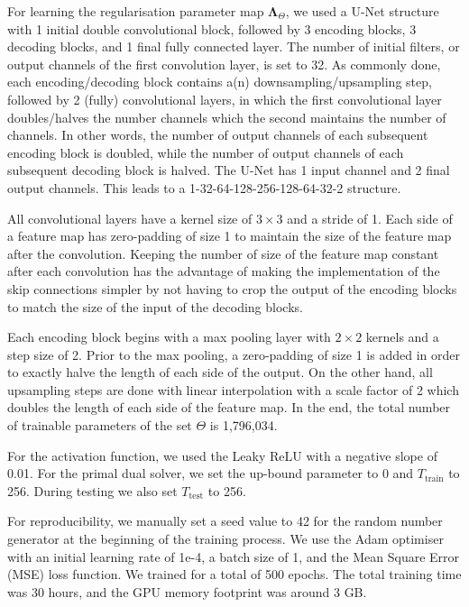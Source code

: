 \documentclass[12pt]{article}
\begin{document}

For learning the regularisation parameter map $\mathbf{\Lambda}_{\Theta}$, we used a U-Net structure with 1 initial double convolutional block, followed by 3 encoding blocks, 3 decoding blocks, and 1 final fully connected layer.
The number of initial filters, or output channels of the first convolution layer, is set to 32.
As commonly done, each encoding/decoding block contains a(n) downsampling/upsampling step, followed by 2 (fully) convolutional layers, in which the first convolutional layer doubles/halves the number channels which the second maintains the number of channels.
In other words, the number of output channels of each subsequent encoding block is doubled, while the number of output channels of each subsequent decoding block is halved.
The U-Net has 1 input channel and 2 final output channels.
This leads to a 1-32-64-128-256-128-64-32-2 structure.

All convolutional layers have a kernel size of $3 \times 3$ and a stride of 1.
Each side of a feature map has zero-padding of size 1 to maintain the size of the feature map after the convolution.
Keeping the number of size of the feature map constant after each convolution has the advantage of making the implementation of the skip connections simpler by not having to crop the output of the encoding blocks to match the size of the input of the decoding blocks.

Each encoding block begins with a max pooling layer with $2 \times 2$ kernels and a step size of 2.
Prior to the max pooling, a zero-padding of size 1 is added in order to exactly halve the length of each side of the output.
On the other hand, all upsampling steps are done with linear interpolation with a scale factor of 2 which doubles the length of each side of the feature map.
In the end, the total number of trainable parameters of the set $\Theta$ is 1,796,034.

For the activation function, we used the Leaky ReLU with a negative slope of 0.01.
For the primal dual solver, we set the up-bound parameter to 0 and $T_{\text{train}}$ to 256.
During testing we also set $T_{\text{test}}$ to 256.

For reproducibility, we manually set a seed value to 42 for the random number generator at the beginning of the training process. We use the Adam optimiser with an initial learning rate of 1e-4, a batch size of 1, and the Mean Square Error (MSE) loss function. We trained for a total of 500 epochs. The total training time was 30 hours, and the GPU memory footprint was around 3 GB.
\end{document}
